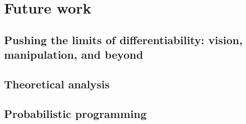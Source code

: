 
\section{Future work}\label{section:future_work}



\subsection{Pushing the limits of differentiability: vision, manipulation, and beyond}





\subsection{Theoretical analysis}



\subsection{Probabilistic programming}


